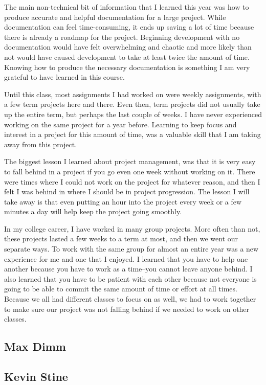 \documentclass[letterpaper,10pt,draftclsnofoot,onecolumn,titlepage]{IEEEtran}
\begin{document}
		The main non-technical bit of information that I learned this year was how to produce accurate and helpful documentation for a large project.
		While documentation can feel time-consuming, it ends up saving a lot of time because there is already a roadmap for the project.
		Beginning development with no documentation would have felt overwhelming and chaotic and more likely than not would have caused development to take at least twice the amount of time.
		Knowing how to produce the necessary documentation is something I am very grateful to have learned in this course.

		Until this class, most assignments I had worked on were weekly assignments, with a few term projects here and there.
		Even then, term projects did not usually take up the entire term, but perhaps the last couple of weeks.
		I have never experienced working on the same project for a year before.
		Learning to keep focus and interest in a project for this amount of time, was a valuable skill that I am taking away from this project.


		The biggest lesson I learned about project management, was that it is very easy to fall behind in a project if you go even one week without working on it.
		There were times where I could not work on the project for whatever reason, and then I felt I was behind in where I should be in project progression.
		The lesson I will take away is that even putting an hour into the project every week or a few minutes a day will help keep the project going smoothly.

		In my college career, I have worked in many group projects.
		More often than not, these projects lasted a few weeks to a term at most, and then we went our separate ways.
		To work with the same group for almost an entire year was a new experience for me and one that I enjoyed.
		I learned that you have to help one another because you have to work as a time--you cannot leave anyone behind.
		I also learned that you have to be patient with each other because not everyone is going to be able to commit the same amount of time or effort at all times.
		Because we all had different classes to focus on as well, we had to work together to make sure our project was not falling behind if we needed to work on other classes.


	\subsection{Max Dimm}

	\subsection{Kevin Stine}
\end{document}
